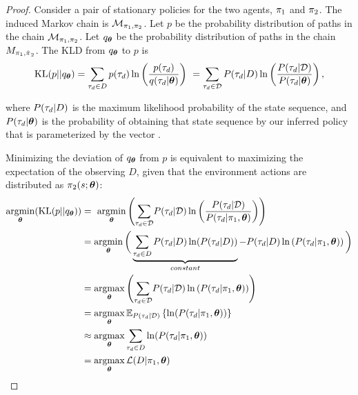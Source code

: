     \begin{proof}
        Consider a pair of stationary policies for the two agents, $\pi_{1}$ and $\pi_{2}$. The induced Markov
        chain is $\mathcal{M}_{\pi_{1}, \pi_{2}}$. Let $p$ be the probability distribution of paths in the chain
        $\mathcal{M}_{\pi_{1}, \pi_{2}}$. Let $q_{\boldsymbol{\mathbb{\theta}}}$ be the probability distribution of paths in the
        chain $M_{\pi_{1}, \hat{\pi_{}}_2}$. The \ac{KLD} from $q_{\boldsymbol{\mathbb{\theta}}}$ to $p$ is
        \begin{equation*}\label{eq:traj_kl_div}
            \text{KL}(p || q_{\boldsymbol{\mathbb{\theta}}}) = \sum_{\tau_d \in D} p(\tau_d) \ln \left( \frac{p(\tau_d)}
                                                {q(\tau_d|\boldsymbol{\mathbb{\theta}})} \right)\
                                          = \sum_{\tau_d \in \mathcal{D}} P(\tau_d|D) \ln \left( \frac{P(\tau_d|\mathcal{D})}
                                                {P(\tau_d|\boldsymbol{\mathbb{\theta}})} \right),
        \end{equation*}

        \noindent
        where $P(\tau_d|D)$ is the maximum likelihood probability of the state sequence, and $P(\tau_d|\boldsymbol{\mathbb{\theta}})$ is
        the probability of obtaining that state sequence by our inferred policy that is parameterized by the vector
        \paramVec.

        Minimizing the deviation of $q_{\boldsymbol{\mathbb{\theta}}}$ from $p$ is equivalent to maximizing the expectation of the
        observing $D$, given that the environment actions are distributed as $\pi_{2}(s; \boldsymbol{\mathbb{\theta}})$:
        \begin{equation}\label{eq:min_kld}
            \begin{aligned}
                \mathop{\mathrm{argmin}}_{\boldsymbol{\mathbb{\theta}}}(\text{KL}(p || q_{\boldsymbol{\mathbb{\theta}}})) & = \
                    \mathop{\mathrm{argmin}}_{\boldsymbol{\mathbb{\theta}}}\left(\sum_{\tau_d \in  \mathcal{D}}\!  P(\tau_d|\mathcal{D})
                    \ln\left(\frac{P(\tau_d|\mathcal{D})}{P(\tau_d|\pi_{1},\boldsymbol{\mathbb{\theta}})}\right)\right)\\
                & = \mathop{\mathrm{argmin}}_{\boldsymbol{\mathbb{\theta}}}\bigg(\underbrace{\sum_{\tau_d \in D} P(\tau_d|D) \ln(P(\tau_d|D))}_{constant} -
                    P(\tau_d|D) \ln\left(P(\tau_d|\pi_{1},\boldsymbol{\mathbb{\theta}})\right)\bigg)\\
                & = \mathop{\mathrm{argmax}}_{\boldsymbol{\mathbb{\theta}}}\left(\sum_{\tau_d \in \mathcal{D}}\!  P(\tau_d|\mathcal{D})
                    \ln\left(P(\tau_d|\pi_{1},\boldsymbol{\mathbb{\theta}})\right)\right)\\
                & = \mathop{\mathrm{argmax}}_{\boldsymbol{\mathbb{\theta}}}\mathbb{E}_{P(\tau_d|\mathcal{D})}\left\{\ln(P(\tau_d|\pi_{1},\boldsymbol{\mathbb{\theta}}))\right\} \\
                &\approx \mathop{\mathrm{argmax}}_{\boldsymbol{\mathbb{\theta}}} \sum_{\tau_d \in D}  \ln(P(\tau_d|\pi_{1},\boldsymbol{\mathbb{\theta}}))\\
                & =\mathop{\mathrm{argmax}}_{\boldsymbol{\mathbb{\theta}}} \mathcal{L}(D|\pi_{1},\boldsymbol{\mathbb{\theta}})
            \end{aligned}
        \end{equation}


\end{proof}
